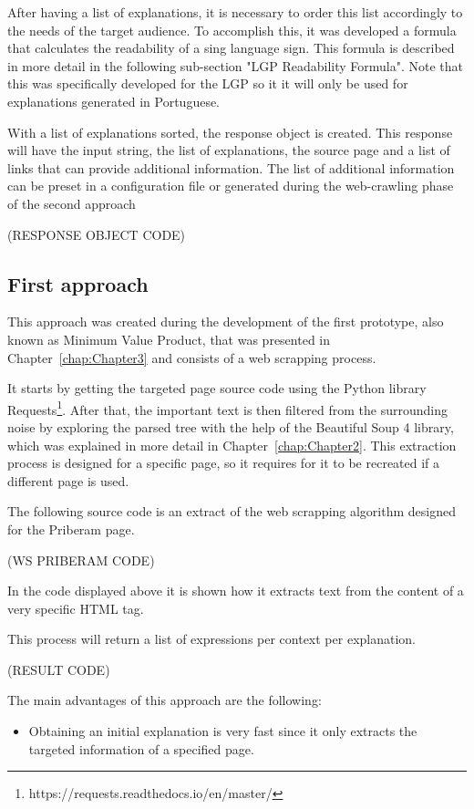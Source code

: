After having a list of explanations, it is necessary to order this list accordingly to the needs of the target audience.
To accomplish this, it was developed a formula that calculates the readability of a sing language sign.
This formula is described in more detail in the following sub-section "LGP Readability Formula".
Note that this was specifically developed for the \gls{LGP} so it it will only be used for explanations generated in Portuguese.

With a list of explanations sorted, the response object is created.
This response will have the input string, the list of explanations, the source page and a list of links that can provide additional information.
The list of additional information can be preset in a configuration file or generated during the web-crawling phase of the second approach

(RESPONSE OBJECT CODE) %

\subsection{First approach}

This approach was created during the development of the first prototype, also known as Minimum Value Product, that was presented in Chapter~\ref{chap:Chapter3} and consists of a web scrapping process.

It starts by getting the targeted page source code using the Python library Requests\footnote{https://requests.readthedocs.io/en/master/}.
After that, the important text is then filtered from the surrounding noise by exploring the parsed tree with the help of the Beautiful Soup 4 library, which was explained in more detail in Chapter~\ref{chap:Chapter2}.
This extraction process is designed for a specific page, so it requires for it to be recreated if a different page is used.

The following source code is an extract of the web scrapping algorithm designed for the Priberam page.

(WS PRIBERAM CODE) %

In the code displayed above it is shown how it extracts text from the content of a very specific HTML tag.

This process will return a list of expressions per context per explanation.

(RESULT CODE) %

The main advantages of this approach are the following:
\begin{itemize}
        \item Obtaining an initial explanation is very fast since it only extracts the targeted information of a specified page.
\end{itemize}

